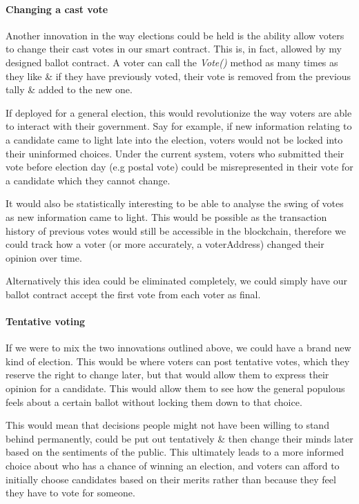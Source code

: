 \documentclass{article}
\begin{document}
\paragraph{Changing a cast vote}
\hfill \break
Another innovation in the way elections could be held is the ability allow voters to change their cast votes in our smart contract. This is, in fact, allowed by my designed ballot contract. A voter can call the \textit{Vote()} method as many times as they like \& if they have previously voted, their vote is removed from the previous tally \& added to the new one.

If deployed for a general election, this would revolutionize the way voters are able to interact with their government. Say for example, if new information relating to a candidate came to light late into the election, voters would not be locked into their uninformed choices. Under the current system, voters who submitted their vote before election day (e.g postal vote) could be misrepresented in their vote for a candidate which they cannot change.

It would also be statistically interesting to be able to analyse the swing of votes as new information came to light. This would be possible as the transaction history of previous votes would still be accessible in the blockchain, therefore we could track how a voter (or more accurately, a voterAddress) changed their opinion over time.

Alternatively this idea could be eliminated completely, we could simply have our ballot contract accept the first vote from each voter as final.

\cleardoublepage
\paragraph{Tentative voting}
\hfill \break
If we were to mix the two innovations outlined above, we could have a brand new kind of election. This would be where voters can post tentative votes, which they reserve the right to change later, but that would allow them to express their opinion for a candidate. This would allow them to see how the general populous feels about a certain ballot without locking them down to that choice.

This would mean that decisions people might not have been willing to stand behind permanently, could be put out tentatively \& then change their minds later based on the sentiments of the public. This ultimately leads to a more informed choice about who has a chance of winning an election, and voters can afford to initially choose candidates based on their merits rather than because they feel they have to vote for someone.
\end{document}

